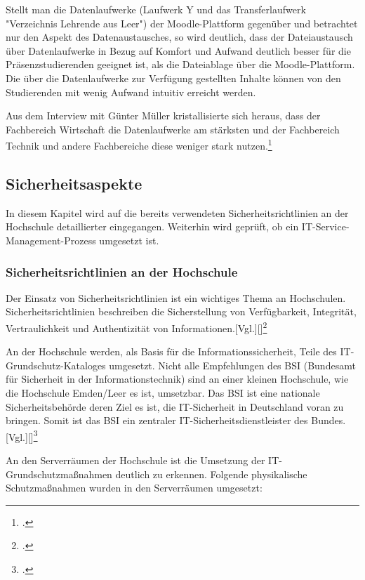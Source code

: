 Stellt man die Datenlaufwerke (Laufwerk Y und das Transferlaufwerk "Verzeichnis Lehrende aus Leer") der Moodle-Plattform gegenüber und betrachtet nur den Aspekt des Datenaustausches, so wird deutlich, dass der Dateiaustausch über Datenlaufwerke in Bezug auf Komfort und Aufwand deutlich besser für die Präsenzstudierenden geeignet ist, als die Dateiablage über die Moodle-Plattform. Die über die Datenlaufwerke zur Verfügung gestellten Inhalte können von den Studierenden mit wenig Aufwand intuitiv erreicht werden.

Aus dem Interview mit Günter Müller kristallisierte sich heraus, dass der Fachbereich Wirtschaft die Datenlaufwerke am stärksten und der Fachbereich Technik und andere Fachbereiche diese weniger stark nutzen.\footcite{gunter_muller_interview}

\subsection{Sicherheitsaspekte}
\label{subsection_sicherheitsaspekte}
In diesem Kapitel wird auf die bereits verwendeten Sicherheitsrichtlinien an der Hochschule detaillierter eingegangen. Weiterhin wird geprüft, ob ein IT-Service-Management-Prozess  umgesetzt ist.

\subsubsection{Sicherheitsrichtlinien an der Hochschule}
Der Einsatz von Sicherheitsrichtlinien ist ein wichtiges Thema an Hochschulen. Sicherheitsrichtlinien beschreiben die Sicherstellung von Verfügbarkeit, Integrität, Vertraulichkeit und Authentizität von Informationen.[Vgl.][]\footcite{sicherheitsrichtlinien_datenschutz-berlin.de_2008}

An der Hochschule werden, als Basis für die Informationssicherheit, Teile des IT-Grundschutz-Kataloges umgesetzt. Nicht alle Empfehlungen des BSI (Bundesamt für Sicherheit in der Informationstechnik) sind an einer kleinen Hochschule, wie die Hochschule Emden/Leer es ist,  umsetzbar. Das BSI ist eine nationale Sicherheitsbehörde deren Ziel es ist, die IT-Sicherheit in Deutschland voran zu bringen. Somit ist das BSI ein zentraler IT-Sicherheitsdienstleister des Bundes.[Vgl.][]\footcite{sicherheitsrichtlinien_bsi.bund.de_2015}

An den Serverräumen der Hochschule ist die Umsetzung der IT-Grundschutzmaßnahmen deutlich zu erkennen.
Folgende physikalische Schutzmaßnahmen wurden in den Serverräumen umgesetzt:

